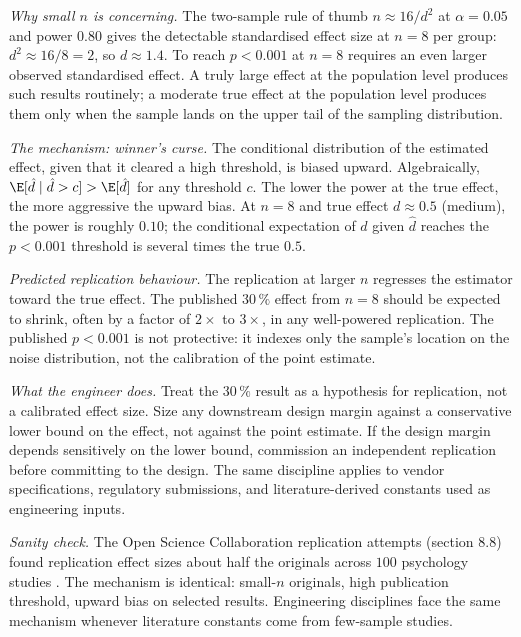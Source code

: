 \textit{Why small $n$ is concerning.} The two-sample rule of thumb
$n \approx 16/d^{2}$ at $\alpha = 0.05$ and power $0.80$ gives the
detectable standardised effect size at $n = 8$ per group:
$d^{2} \approx 16/8 = 2$, so $d \approx 1.4$. To reach $p < 0.001$
at $n = 8$ requires an even larger observed standardised effect.
A truly large effect at the population level produces such results
routinely; a moderate true effect at the population level produces
them only when the sample lands on the upper tail of the
sampling distribution.

\textit{The mechanism: winner's curse.} The conditional distribution
of the estimated effect, given that it cleared a high threshold,
is biased upward. Algebraically, $\E[\hat{d} \mid \hat{d} > c]
> \E[\hat{d}]$ for any threshold $c$. The lower the power at the
true effect, the more aggressive the upward bias. At $n = 8$ and
true effect $d \approx 0.5$ (medium), the power is roughly $0.10$;
the conditional expectation of $\hat{d}$ given $\hat{d}$ reaches
the $p < 0.001$ threshold is several times the true $0.5$.

\textit{Predicted replication behaviour.} The replication at larger
$n$ regresses the estimator toward the true effect. The published
$30 \,\%$ effect from $n = 8$ should be expected to shrink, often
by a factor of $2 \times$ to $3 \times$, in any well-powered
replication. The published $p < 0.001$ is not protective: it
indexes only the sample's location on the noise distribution, not
the calibration of the point estimate.

\textit{What the engineer does.} Treat the $30 \,\%$ result as a
hypothesis for replication, not a calibrated effect size. Size any
downstream design margin against a conservative lower bound on the
effect, not against the point estimate. If the design margin
depends sensitively on the lower bound, commission an independent
replication before committing to the design. The same discipline
applies to vendor specifications, regulatory submissions, and
literature-derived constants used as engineering inputs.

\textit{Sanity check.} The Open Science Collaboration replication
attempts (section 8.8) found replication effect sizes about half
the originals across $100$ psychology studies
\cite{method:open-science-collaboration-2015}. The mechanism is
identical: small-$n$ originals, high publication threshold, upward
bias on selected results. Engineering disciplines face the same
mechanism whenever literature constants come from few-sample
studies.

